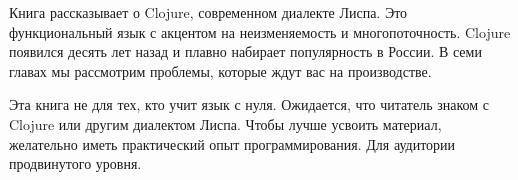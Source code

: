 \thispagestyle{empty}

\small

Книга рассказывает о Clojure, современном диалекте Лиспа. Это функциональный
язык с акцентом на неизменяемость и многопоточность. Clojure появился десять лет
назад и плавно набирает популярность в России. В семи главах мы рассмотрим
проблемы, которые ждут вас на производстве.

Эта книга не для тех, кто учит язык с нуля. Ожидается, что читатель знаком с
Clojure или другим диалектом Лиспа. Чтобы лучше усвоить материал, желательно
иметь практический опыт программирования. Для аудитории продвинутого уровня.
